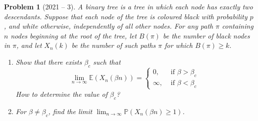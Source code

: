 \documentclass[12pt]{amsart}
\newtheorem{problem}{Problem}
\begin{document}
\begin{problem}[2021 -- 3]
A binary tree is a tree in which each node has exactly two descendants. Suppose that each node of the tree is coloured black with probability $p$, and white otherwise, independently of all other nodes. For any path $\pi$ containing $n$ nodes beginning at the root of the tree, let $B(\pi)$ be the number of black nodes in $\pi$, and let $X_n(k)$ be the number of such paths $\pi$ for which $B(\pi) \geq k$.
\begin{enumerate}[label=(\alph*)]
\item Show that there exists $\beta_c$ such that
$$
\lim _{n \rightarrow \infty} \mathbb{E}(X_n(\beta n))= \begin{cases}0, & \text { if } \beta>\beta_c \\ \infty, & \text { if } \beta<\beta_c\end{cases}
$$
How to determine the value of $\beta_c$?
\item For $\beta \neq \beta_c$, find the limit $\lim _{n \rightarrow \infty} \mathbb{P}(X_n(\beta n) \geq 1)$.
\end{enumerate}
\end{problem}
\end{document}
